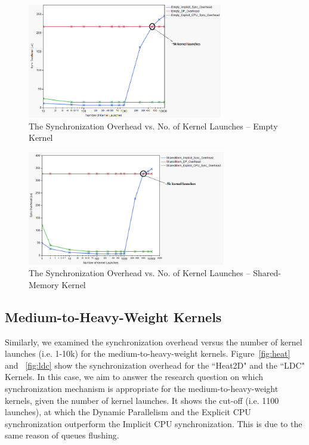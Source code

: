 \documentclass[conference]{IEEEtran}
\begin{document}
\begin{figure}
	\includegraphics[width=1.0\columnwidth, height=5cm]{empty_kernel_sync_log_1.png}
	\caption{The Synchronization Overhead vs. No. of Kernel Launches -- Empty Kernel}
	\label{fig:empty}
\end{figure}
\begin{figure}
	\includegraphics[width=1.0\columnwidth, height=5cm]{shared_mem_kernel_log.png}
	\caption{The Synchronization Overhead vs. No. of Kernel Launches -- Shared-Memory Kernel}
	\label{fig:shared}
\end{figure}

\subsection{Medium-to-Heavy-Weight Kernels}
Similarly, we examined the synchronization overhead versus the number of kernel launches (i.e. 1-10k) for the medium-to-heavy-weight kernels. Figure~\ref{fig:heat} and ~\ref{fig:ldc} show the synchronization overhead for the ``Heat2D" and the ``LDC" Kernels. In this case, we aim to answer the research question on which synchronization mechanism is appropriate for the medium-to-heavy-weight kernels, given the number of kernel launches. It shows the cut-off (i.e. 1100 launches), at which the Dynamic Parallelism and the Explicit CPU synchronization outperform the Implicit CPU synchronization. This is due to the same reason of queues flushing.
\end{document}
